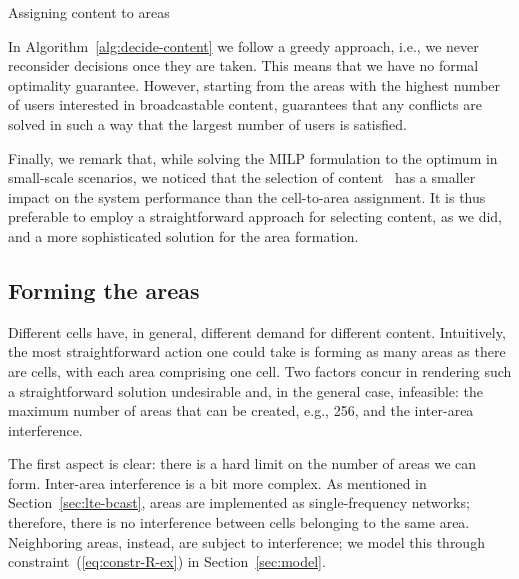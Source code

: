 \documentclass[10pt, conference, compsocconf]{IEEEtran}
\numberwithin{equation}{section}
\begin{document}
\begin{algorithm}
\begin{algorithmic}[1]
\Require{\}}
 \label{line:cont-sort}
\ForAll{}
 \label{line:cont-viable}
 \label{line:cont-continue}
\EndIf
\State{} \label{line:cont-argmax}
\EndFor
\end{algorithmic}
\caption{Assigning content to areas
\label{alg:decide-content}}
\end{algorithm}

In Algorithm~\ref{alg:decide-content} we follow a greedy approach,
i.e., we never reconsider decisions once they are taken. This means that we have no formal
optimality guarantee. However, starting from the areas with the
highest number of users interested in broadcastable content, guarantees that any conflicts
are solved in such a way that the largest number of users is satisfied.

Finally, we remark that, while solving the MILP formulation to the optimum in
small-scale scenarios, we noticed that the selection of content~ has a
smaller 
impact on the system performance
than the cell-to-area assignment. It is thus preferable to employ a straightforward
approach for selecting content, as we did, and a more sophisticated solution for the
area formation.


\subsection{Forming the areas}

Different cells have, in general, different demand for different content. Intuitively,
the most straightforward action one could take is forming as many areas as there are cells, with
each area comprising one cell. Two factors concur in rendering such a straightforward
solution undesirable and, in the general case, infeasible: the maximum number of areas that can be created, e.g., 256,
and the inter-area interference.


The first aspect is clear: there is a hard limit on the number of
areas we can form.
Inter-area interference is a bit more complex. As mentioned in Section~\ref{sec:lte-bcast},
areas are implemented as single-frequency networks; therefore, there is no interference
between cells belonging to the same area. Neighboring areas, instead, are subject to
interference; we model this through constraint~(\ref{eq:constr-R-ex}) in Section~\ref{sec:model}.
\end{document}
